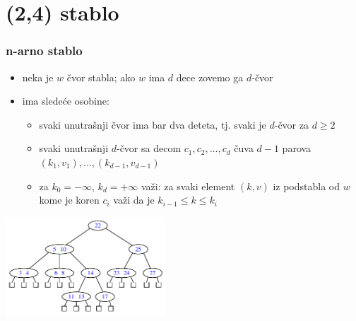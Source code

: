 \documentclass[compress]{beamer}
\begin{document}
\section[(2,4) stablo]{(2,4) stablo}
\begin{frame}[fragile]
  \frametitle{n-arno stablo}
  \begin{itemize}
    \item neka je $w$ čvor stabla; ako $w$ ima $d$ dece zovemo ga $d$-čvor
    \item {} ima sledeće osobine:
    \begin{itemize}
      \item svaki unutrašnji čvor ima bar dva deteta, tj. svaki je $d$-čvor za $d\geq 2$
      \item svaki unutrašnji $d$-čvor sa decom $c_1, c_2, \ldots, c_d$ čuva $d-1$ parova $(k_1,v_1), \ldots, (k_{d-1},v_{d-1})$
      \item za $k_0=-\infty$, $k_d=+\infty$ važi: za svaki element $(k,v)$ iz podstabla od $w$ kome je koren $c_i$ važi da je $k_{i-1}\leq k\leq k_{i}$ 
    \end{itemize}
  \end{itemize}
  \begin{center}
    \includegraphics[width=6cm]{asp-11-pic27.pdf}
  \end{center}
\end{frame}
\end{document}
